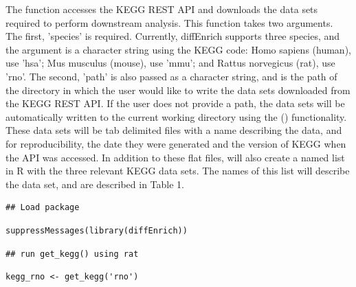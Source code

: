 \documentclass[article]{jss}\usepackage[]{graphicx}\usepackage[]{color}
\makeatletter
\newenvironment{kframe}{%
 \def\at@end@of@kframe{}%
 \ifinner\ifhmode%
  \def\at@end@of@kframe{\end{minipage}}%
  \begin{minipage}{\columnwidth}%
 \fi\fi%
 \def\FrameCommand##1{\hskip\@totalleftmargin \hskip-\fboxsep
 \colorbox{shadecolor}{##1}\hskip-\fboxsep
     \hskip-\linewidth \hskip-\@totalleftmargin \hskip\columnwidth}%
 \MakeFramed {\advance\hsize-\width
   \@totalleftmargin\z@ \linewidth\hsize
   \@setminipage}}%
 {\par\unskip\endMakeFramed%
 \at@end@of@kframe}
\newenvironment{knitrout}{}{} %
\makeatother
\begin{document}
The  function accesses the KEGG REST API and downloads the data
sets required to perform downstream analysis. This function takes two arguments.
The first, 'species' is required. Currently, diffEnrich supports three species,
and the argument is a character string using the KEGG code: Homo sapiens
(human), use 'hsa'; Mus musculus (mouse), use 'mmu'; and Rattus norvegicus
(rat), use 'rno'. The second, 'path' is also passed as a character string, and
is the path of the directory in which the user would like to write the data sets
downloaded from the KEGG REST API. If the user does not provide a path, the data
sets will be automatically written to the current working directory using the
 (\cite{kirill:2017}) functionality. These data sets will be
tab delimited files with a name describing the data, and for reproducibility,
the date they were generated and the version of KEGG when the API was accessed.
In addition to these flat files,  will also create a named list
in R with the three relevant KEGG data sets. The names of this list will
describe the data set, and are described in Table 1.

\begin{knitrout}
\color{fgcolor}\begin{kframe}
\begin{lstlisting}[basicstyle=\ttfamily,breaklines=true]
## Load package\end{lstlisting}
\begin{lstlisting}[basicstyle=\ttfamily,breaklines=true]
suppressMessages(library(diffEnrich))\end{lstlisting}
\begin{lstlisting}[basicstyle=\ttfamily,breaklines=true]
## run get_kegg() using rat\end{lstlisting}
\begin{lstlisting}[basicstyle=\ttfamily,breaklines=true]
kegg_rno <- get_kegg('rno')\end{lstlisting}


{\ttfamily\noindent\itshape\color{messagecolor}{\#\# 3 data sets will be written as tab delimited text files}}

{\ttfamily\noindent\itshape\color{messagecolor}{\#\# File location: /Users/harry/Documents/Saba\_Lab/diffEnrich}}

{\ttfamily\noindent\itshape\color{messagecolor}{\#\# Kegg Release: Release\_92.0+\_12-05\_Dec\_19}}\end{kframe}
\end{knitrout}
\end{document}
